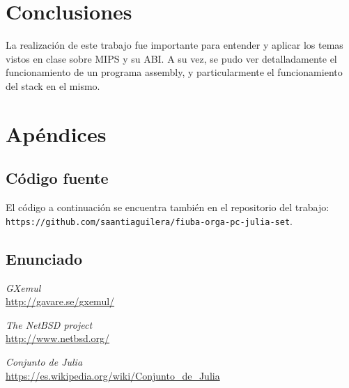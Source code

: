 \documentclass[10pt,a4paper]{article}
\begin{document}
\section{Conclusiones}
La realización de este trabajo fue importante para entender y aplicar los temas vistos en clase sobre MIPS y su ABI. A su vez, se pudo ver detalladamente el funcionamiento de un programa assembly, y particularmente el funcionamiento del stack en el mismo. 

\section{Apéndices}

\subsection{Código fuente}
El código a continuación se encuentra también en el repositorio del trabajo: \\
\texttt{https://github.com/saantiaguilera/fiuba-orga-pc-julia-set}.\\



\subsection{Enunciado}




\begin{thebibliography}{99}
 \emph{GXemul}\\
\url{http://gavare.se/gxemul/}

 \emph{The NetBSD project}\\
\url{http://www.netbsd.org/}

 \emph{Conjunto de Julia}\\
\url{https://es.wikipedia.org/wiki/Conjunto_de_Julia}

\end{thebibliography}
\end{document}
